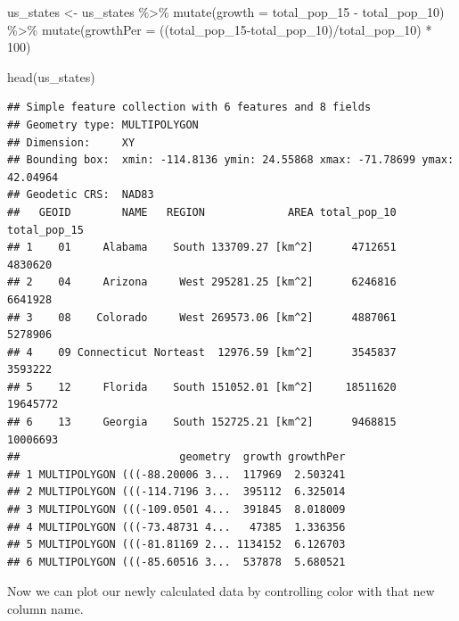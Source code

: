 \documentclass[
]{book}
\newenvironment{Shaded}{\begin{snugshade}}{\end{snugshade}}
\newcommand{\AttributeTok}[1]{\textcolor[rgb]{0.77,0.63,0.00}{#1}}
\newcommand{\DecValTok}[1]{\textcolor[rgb]{0.00,0.00,0.81}{#1}}
\newcommand{\FunctionTok}[1]{\textcolor[rgb]{0.00,0.00,0.00}{#1}}
\newcommand{\NormalTok}[1]{#1}
\newcommand{\OtherTok}[1]{\textcolor[rgb]{0.56,0.35,0.01}{#1}}
\newcommand{\SpecialCharTok}[1]{\textcolor[rgb]{0.00,0.00,0.00}{#1}}
\begin{document}
\begin{Shaded}
\begin{Highlighting}[]
\NormalTok{us\_states }\OtherTok{\textless{}{-}}\NormalTok{ us\_states }\SpecialCharTok{\%\textgreater{}\%} 
  \FunctionTok{mutate}\NormalTok{(}\AttributeTok{growth =}\NormalTok{ total\_pop\_15 }\SpecialCharTok{{-}}\NormalTok{ total\_pop\_10) }\SpecialCharTok{\%\textgreater{}\%}
  \FunctionTok{mutate}\NormalTok{(}\AttributeTok{growthPer =}\NormalTok{ ((total\_pop\_15}\SpecialCharTok{{-}}\NormalTok{total\_pop\_10)}\SpecialCharTok{/}\NormalTok{total\_pop\_10) }\SpecialCharTok{*} \DecValTok{100}\NormalTok{)}

\FunctionTok{head}\NormalTok{(us\_states)}
\end{Highlighting}
\end{Shaded}

\begin{verbatim}
## Simple feature collection with 6 features and 8 fields
## Geometry type: MULTIPOLYGON
## Dimension:     XY
## Bounding box:  xmin: -114.8136 ymin: 24.55868 xmax: -71.78699 ymax: 42.04964
## Geodetic CRS:  NAD83
##   GEOID        NAME   REGION             AREA total_pop_10 total_pop_15
## 1    01     Alabama    South 133709.27 [km^2]      4712651      4830620
## 2    04     Arizona     West 295281.25 [km^2]      6246816      6641928
## 3    08    Colorado     West 269573.06 [km^2]      4887061      5278906
## 4    09 Connecticut Norteast  12976.59 [km^2]      3545837      3593222
## 5    12     Florida    South 151052.01 [km^2]     18511620     19645772
## 6    13     Georgia    South 152725.21 [km^2]      9468815     10006693
##                         geometry  growth growthPer
## 1 MULTIPOLYGON (((-88.20006 3...  117969  2.503241
## 2 MULTIPOLYGON (((-114.7196 3...  395112  6.325014
## 3 MULTIPOLYGON (((-109.0501 4...  391845  8.018009
## 4 MULTIPOLYGON (((-73.48731 4...   47385  1.336356
## 5 MULTIPOLYGON (((-81.81169 2... 1134152  6.126703
## 6 MULTIPOLYGON (((-85.60516 3...  537878  5.680521
\end{verbatim}

Now we can plot our newly calculated data by controlling color with that new column name.
\end{document}
